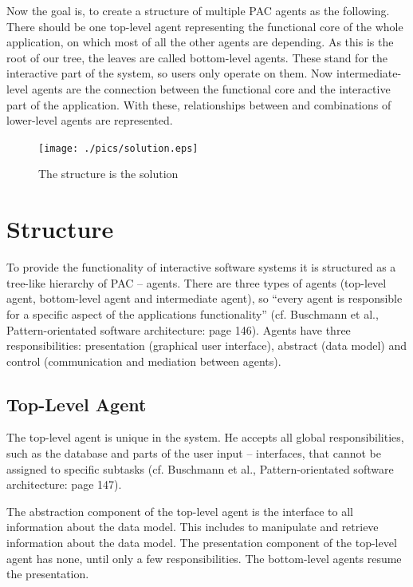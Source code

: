 \documentclass{scrbook}
\begin{document}
Now the goal is, to create a structure of multiple PAC agents as the following. There should be one
top-level agent representing the functional core of the whole application, on which most of all the
other agents are depending. As this is the root of our tree, the leaves are called bottom-level agents.
These stand for the interactive part of the system, so users only operate on them. Now intermediate-
level agents are the connection between the functional core and the interactive part of the
application. With these, relationships between and combinations of lower-level agents are
represented.

\begin{figure}
 \centering
 \texttt{[image: ./pics/solution.eps]}
 \caption{The structure is the solution}
 \label{abb:sol}
\end{figure}





\section{Structure}	%

To provide the functionality of interactive software systems it is structured as a tree-like hierarchy of
PAC – agents. There are three types of agents (top-level agent, bottom-level agent and intermediate
agent), so “every agent is responsible for a specific aspect of the applications functionality” (cf.
Buschmann et al., Pattern-orientated software architecture: page 146). Agents have three
responsibilities: presentation (graphical user interface), abstract (data model) and control
(communication and mediation between agents).



\subsection{Top-Level Agent}	%

The top-level agent is unique in the system. He accepts all global responsibilities, such as the
database and parts of the user input – interfaces, that cannot be assigned to specific subtasks (cf.
Buschmann et al., Pattern-orientated software architecture: page 147).

The abstraction component of the top-level agent is the interface to all information about the data
model. This includes to manipulate and retrieve information about the data model.
The presentation component of the top-level agent has none, until only a few responsibilities. The
bottom-level agents resume the presentation.
\end{document}
